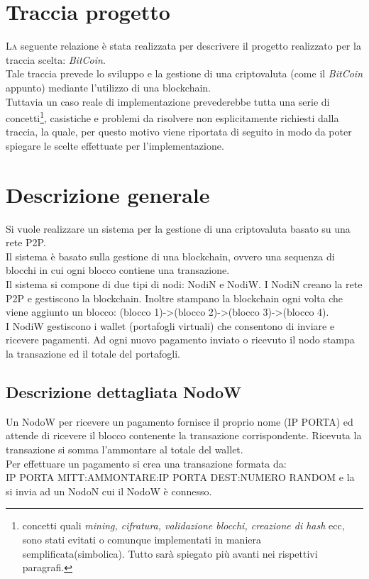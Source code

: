\section{Traccia progetto}
\lettrine{L}{a} seguente relazione è stata realizzata per descrivere il progetto realizzato per la traccia scelta: \textit{BitCoin}.
\\Tale traccia prevede lo sviluppo e la gestione di una criptovaluta  (come il \textit{BitCoin} appunto) mediante l'utilizzo di una blockchain. \\Tuttavia un caso reale di implementazione prevederebbe tutta una serie di concetti\footnote{concetti quali \textit{mining, cifratura, validazione blocchi, creazione di hash} ecc, sono stati evitati o comunque implementati in maniera semplificata(simbolica). Tutto sarà  spiegato più avanti nei rispettivi paragrafi.}, casistiche e problemi da risolvere non esplicitamente richiesti dalla traccia, la quale, per questo motivo viene riportata di seguito in modo da poter spiegare le scelte effettuate per l'implementazione.

\section*{Descrizione generale}
Si vuole realizzare un sistema per la gestione di una criptovaluta basato su una rete P2P. \\ Il sistema è basato sulla gestione di una blockchain, ovvero una sequenza di blocchi in cui ogni blocco contiene una transazione.\\
Il sistema si compone di due tipi di nodi: NodiN e NodiW. I NodiN creano la rete P2P e gestiscono la blockchain. Inoltre stampano la blockchain ogni volta che viene aggiunto un blocco: (blocco 1)->(blocco 2)->(blocco 3)->(blocco 4). \\I NodiW gestiscono i wallet (portafogli virtuali) che consentono di inviare e ricevere pagamenti. Ad ogni nuovo pagamento inviato o ricevuto il nodo stampa la transazione ed il totale del portafogli.

\subsection*{Descrizione dettagliata NodoW}
Un NodoW per ricevere un pagamento fornisce il proprio nome (IP PORTA) ed attende di ricevere il blocco contenente la transazione corrispondente. Ricevuta la transazione si somma l’ammontare al totale del wallet. \\Per effettuare un pagamento si crea una transazione formata da:\\ IP PORTA MITT:AMMONTARE:IP PORTA DEST:NUMERO RANDOM e la si invia ad un NodoN cui il NodoW è connesso.

